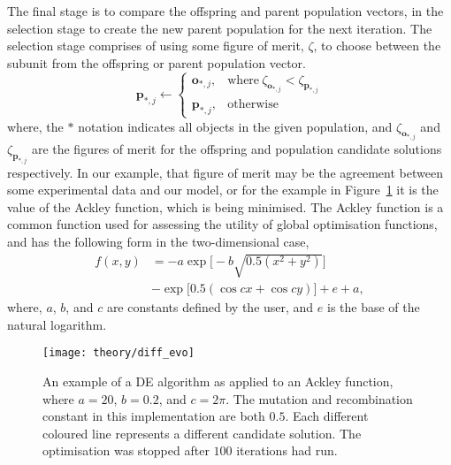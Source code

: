 The final stage is to compare the offspring and parent population vectors, in the selection stage to create the new parent population for the next iteration.
The selection stage comprises of using some figure of merit, $\zeta$, to choose between the subunit from the offspring or parent population vector.
%
\begin{equation}
    \mathbf{p}_{*,j} \leftarrow
    \begin{cases}
        \mathbf{o}_{*,j}, & \text{where}\ \zeta_{\mathbf{o}_{*,j}} < \zeta_{\mathbf{p}_{*,j}} \\
        \mathbf{p}_{*,j}, & \text{otherwise}
    \end{cases}
\end{equation}
%
where, the $*$ notation indicates all objects in the given population, and $\zeta_{\mathbf{o}_{*,j}}$ and $\zeta_{\mathbf{p}_{*,j}}$ are the figures of merit for the offspring and population candidate solutions respectively.
In our example, that figure of merit may be the agreement between some experimental data and our model, or for the example in Figure~\ref{fig:diff_evo} it is the value of the Ackley function,\autocite{ackley_connectionist_1987} which is being minimised.
The Ackley function is a common function used for assessing the utility of global optimisation functions, and has the following form in the two-dimensional case, 
%
\begin{equation}
\begin{aligned}
f(x,y) & = -a \exp{\big[-b\sqrt{0.5(x^2 + y^2)}\big]} \\
 & - \exp{\big[0.5(\cos{cx} + \cos{cy})\big]} + e + a,
\end{aligned}
\end{equation}
%
where, $a$, $b$, and $c$ are constants defined by the user, and $e$ is the base of the natural logarithm. 
%
\begin{figure}[t]
    \centering
    \texttt{[image: theory/diff\_evo]}
    \caption{An example of a DE algorithm as applied to an Ackley function, where $a=20$, $b=0.2$, and $c=2\pi$. The mutation and recombination constant in this implementation are both $0.5$. Each different coloured line represents a different candidate solution. The optimisation was stopped after $100$ iterations had run.}
    \label{fig:diff_evo}
\end{figure}
%

